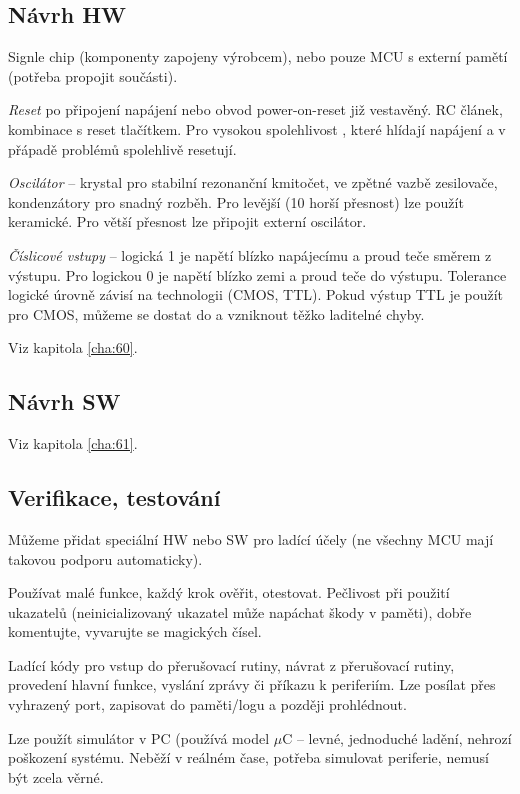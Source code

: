 \documentclass[a4paper, 11pt]{report}
\begin{document}
\subsection{Návrh HW}
Signle chip (komponenty zapojeny výrobcem), nebo pouze MCU s externí pamětí (potřeba propojit součásti).

\emph{Reset} po připojení napájení nebo obvod power-on-reset již vestavěný. RC článek, kombinace s reset tlačítkem. Pro vysokou spolehlivost , které hlídají napájení a v přápadě problémů spolehlivě resetují.

\emph{Oscilátor} -- krystal pro stabilní rezonanční kmitočet, ve zpětné vazbě zesilovače, kondenzátory pro snadný rozběh. Pro levější (10 horší přesnost) lze použít keramické. Pro větší přesnost lze připojit externí oscilátor.

\emph{Číslicové vstupy} -- logická 1 je napětí blízko napájecímu a proud teče směrem z výstupu. Pro logickou 0 je napětí blízko zemi a proud teče do výstupu. Tolerance logické úrovně závisí na technologii (CMOS, TTL). Pokud výstup TTL je použít pro CMOS, můžeme se dostat do  a vzniknout těžko laditelné chyby.

Viz kapitola \ref{cha:60}.

\subsection{Návrh SW}
Viz kapitola \ref{cha:61}.

\subsection{Verifikace, testování}
Můžeme přidat speciální HW nebo SW pro ladící účely (ne všechny MCU mají takovou podporu automaticky).

Používat malé funkce, každý krok ověřit, otestovat. Pečlivost při použití ukazatelů (neinicializovaný ukazatel může  napáchat škody v paměti), dobře komentujte, vyvarujte se magických čísel.

Ladící kódy pro vstup do přerušovací rutiny, návrat z přerušovací rutiny, provedení hlavní funkce, vyslání zprávy či příkazu k periferiím. Lze posílat přes vyhrazený port, zapisovat do paměti/logu a později prohlédnout.

Lze použít simulátor v PC (používá model $\mu$C -- levné, jednoduché ladění, nehrozí poškození systému. Neběží v reálném čase, potřeba simulovat periferie, nemusí být zcela věrné.
\end{document}

